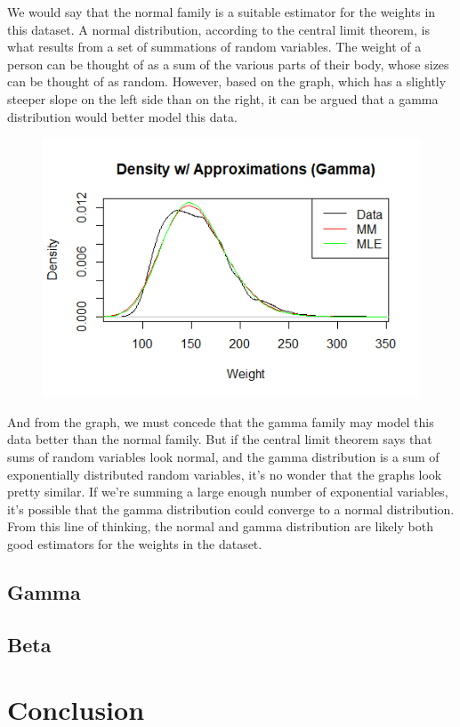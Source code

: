 \documentclass[12pt, a4paper, oneside]{report}
\begin{document}
We would say that the normal family is a suitable estimator for the weights in this dataset. A normal distribution, according to the central limit theorem, is what results from a set of summations of random variables. The weight of a person can be thought of as a sum of the various parts of their body, whose sizes can be thought of as random. 
However, based on the graph, which has a slightly steeper slope on the left side than on the right, it can be argued that a gamma distribution would better model this data. 

\begin{figure}[h]
  \centering
  \includegraphics[width=0.8\linewidth]{normButGamma.png}
\end{figure}

\newpage
And from the graph, we must concede that the gamma family may model this data better than the normal family. But if the central limit theorem says that sums of random variables look normal, and the gamma distribution is a sum of exponentially distributed random variables, it’s no wonder that the graphs look pretty similar. If we’re summing a large enough number of exponential variables, it’s possible that the gamma distribution could converge to a normal distribution. From this line of thinking, the normal and gamma distribution are likely both good estimators for the weights in the dataset.







\newpage
\section{Gamma}
\newpage


\section{Beta}
\newpage


\chapter{Conclusion}
\newpage
\end{document}
